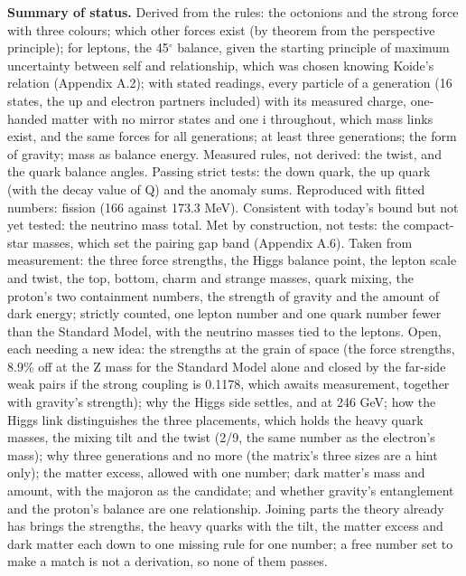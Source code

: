 \documentclass[
  11pt,
]{article}
\newcounter{none} %
\begin{document}
\textbf{Summary of status.} Derived from the rules: the octonions and the strong force with three colours; which other forces exist (by theorem from the perspective principle); for leptons, the 45\ensuremath{^\circ} balance, given the starting principle of maximum uncertainty between self and relationship, which was chosen knowing Koide's relation (Appendix A.2); with stated readings, every particle of a generation (16 states, the up and electron partners included) with its measured charge, one-handed matter with no mirror states and one i throughout, which mass links exist, and the same forces for all generations; at least three generations; the form of gravity; mass as balance energy. Measured rules, not derived: the twist, and the quark balance angles. Passing strict tests: the down quark, the up quark (with the decay value of Q) and the anomaly sums. Reproduced with fitted numbers: fission (166 against 173.3 MeV). Consistent with today's bound but not yet tested: the neutrino mass total. Met by construction, not tests: the compact-star masses, which set the pairing gap band (Appendix A.6). Taken from measurement: the three force strengths, the Higgs balance point, the lepton scale and twist, the top, bottom, charm and strange masses, quark mixing, the proton's two containment numbers, the strength of gravity and the amount of dark energy; strictly counted, one lepton number and one quark number fewer than the Standard Model, with the neutrino masses tied to the leptons. Open, each needing a new idea: the strengths at the grain of space (the force strengths, 8.9\% off at the Z mass for the Standard Model alone and closed by the far-side weak pairs if the strong coupling is 0.1178, which awaits measurement, together with gravity's strength); why the Higgs side settles, and at 246 GeV; how the Higgs link distinguishes the three placements, which holds the heavy quark masses, the mixing tilt and the twist (2/9, the same number as the electron's mass); why three generations and no more (the matrix's three sizes are a hint only); the matter excess, allowed with one number; dark matter's mass and amount, with the majoron as the candidate; and whether gravity's entanglement and the proton's balance are one relationship. Joining parts the theory already has brings the strengths, the heavy quarks with the tilt, the matter excess and dark matter each down to one missing rule for one number; a free number set to make a match is not a derivation, so none of them passes.
\end{document}
